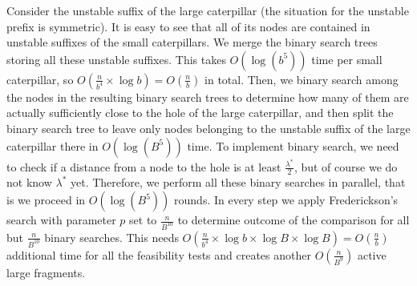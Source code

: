 \documentclass[11pt,a4paper]{article}
\theoremstyle{definition}
\theoremstyle{remark}
\begin{document}
Consider the unstable suffix of the large caterpillar (the situation for the unstable prefix is
symmetric). It is easy to see that all of its nodes are contained in unstable suffixes of
the small caterpillars. We merge the binary search trees storing all these unstable suffixes.
This takes $O(\log (b^{5}))$ time per small caterpillar, so $O(\frac{n}{b^{4}}\times \log b)=O(\frac{n}{b})$ in total.
Then, we binary search among the nodes in the resulting binary search trees to determine
how many of them are actually sufficiently close to the hole of the large caterpillar, and
then split the binary search tree to leave only nodes belonging to the unstable suffix
of the large caterpillar there in $O(\log (B^{5}))$ time. To implement binary search, we need to
check if a distance from a node to the hole is at least $\frac{\lambda^{*}}{2}$, but of course we
do not know $\lambda^{*}$ yet. Therefore, we perform all these binary searches in parallel,
that is we proceed in $O(\log (B^{5}))$ rounds. In every step we apply Frederickson's search
with parameter $p$ set to $\frac{n}{B^{10}}$ to determine outcome of the comparison for all
but $\frac{n}{B^{10}}$ binary searches. This needs
$O(\frac{n}{b^{4}}\times\log b\times\log B\times\log B)=O(\frac{n}{b})$ additional time for
all the feasibility tests and creates another $O(\frac{n}{B^{9}})$ active large fragments.
\end{document}
